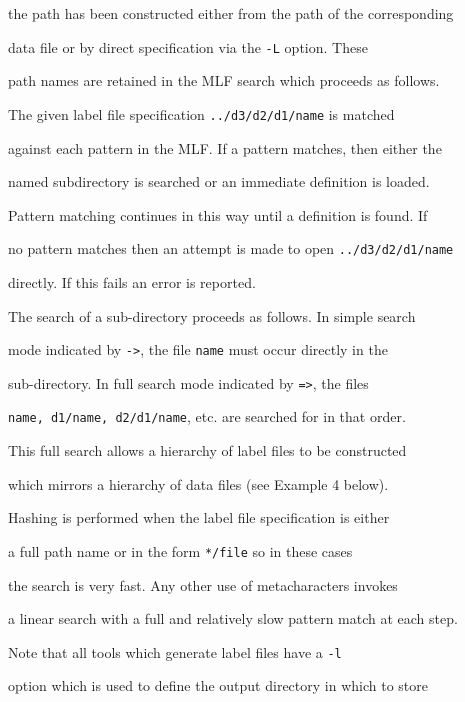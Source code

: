 the path has been constructed either from the path of the corresponding


data file or by direct specification via the {\tt -L} option.  These


path names are retained in the MLF search which proceeds as follows.


The given label file specification \texttt{../d3/d2/d1/name} is matched


against each pattern in the MLF.  If a pattern matches, then either the


named subdirectory is searched or an immediate definition is loaded.


Pattern matching continues in this way until a definition is found.  If


no pattern matches then an attempt is made to open \texttt{../d3/d2/d1/name}


directly.  If this fails an error is reported.





The search of a sub-directory proceeds as follows.  In simple search


mode indicated by  \texttt{->}, the file \texttt{name} must occur directly in the


sub-directory.  In full search mode indicated by \texttt{=>}, the files


\texttt{name, d1/name, d2/d1/name}, etc. are searched for in that order.


This full search allows a hierarchy of label files to be constructed


which mirrors a hierarchy of data files (see Example 4 below).


   


Hashing is performed when the label file specification is either


a full path name or in the form \texttt{*/file} so in these cases


the search is very fast. Any other use of metacharacters invokes


a linear search with a full and relatively slow pattern match at each step.


Note that all tools which generate label files have a \texttt{-l}


option which is used to define the output directory in which to store


